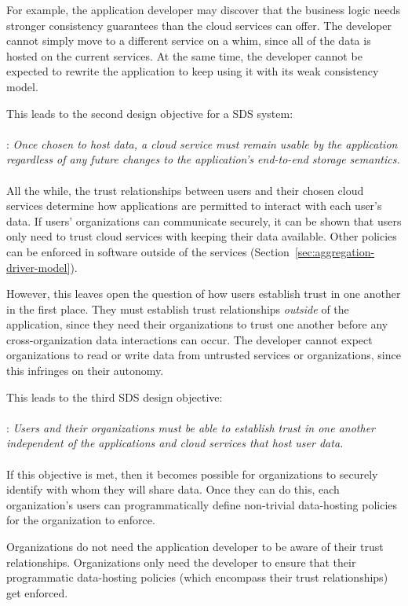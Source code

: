 For example, the application developer may discover that the business logic needs stronger
consistency guarantees than the cloud services can offer.  The developer cannot
simply move to a different service on a whim, since all of the data is hosted 
on the current services.  At the same time, the developer cannot be expected
to rewrite the application to keep using it with its weak consistency model.

This leads to the second design objective for a SDS system:
\\
\\
: \emph{Once chosen to host data, a cloud service
must remain usable by the application regardless of any future changes to the
application's end-to-end storage semantics.}
\\
\\
All the while, the trust relationships between users and
their chosen cloud services determine how applications are permitted to
interact with each user's data.  If users' organizations can communicate securely,
it can be shown that users only need to trust cloud services with
keeping their data available.  Other policies can be enforced
in software outside of the services (Section~\ref{sec:aggregation-driver-model}).

However, this leaves open the question of how users establish
trust in one another in the first place.  They must
establish trust relationships \emph{outside} of the application, since they need
their organizations to trust one another
before any cross-organization data interactions can occur.  The developer
cannot expect organizations to read or write data from untrusted services or
organizations, since this infringes on their autonomy.

This leads to the third SDS design objective:
\\
\\
: \emph{Users and their organizations
must be able to establish trust in one another independent of the
applications and cloud services that host user data.}
\\
\\
If this objective is met, then it becomes possible for organizations to
securely identify with whom they will share data.  Once they can do this,
each organization's users can programmatically define non-trivial data-hosting policies
for the organization to enforce.

Organizations do not need the application developer to be aware
of their trust relationships.  Organizations only need the developer to
ensure that their programmatic data-hosting policies (which encompass their trust
relationships) get enforced.

